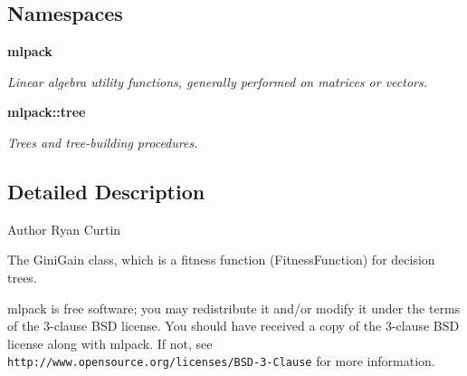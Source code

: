 \subsection*{Namespaces}
\begin{DoxyCompactItemize}
\item 
 \textbf{ mlpack}
\begin{DoxyCompactList}\small\item\em Linear algebra utility functions, generally performed on matrices or vectors. \end{DoxyCompactList}\item 
 \textbf{ mlpack\+::tree}
\begin{DoxyCompactList}\small\item\em Trees and tree-\/building procedures. \end{DoxyCompactList}\end{DoxyCompactItemize}


\subsection{Detailed Description}
\begin{DoxyAuthor}{Author}
Ryan Curtin
\end{DoxyAuthor}
The Gini\+Gain class, which is a fitness function (Fitness\+Function) for decision trees.

mlpack is free software; you may redistribute it and/or modify it under the terms of the 3-\/clause B\+SD license. You should have received a copy of the 3-\/clause B\+SD license along with mlpack. If not, see {\tt http\+://www.\+opensource.\+org/licenses/\+B\+S\+D-\/3-\/\+Clause} for more information. 